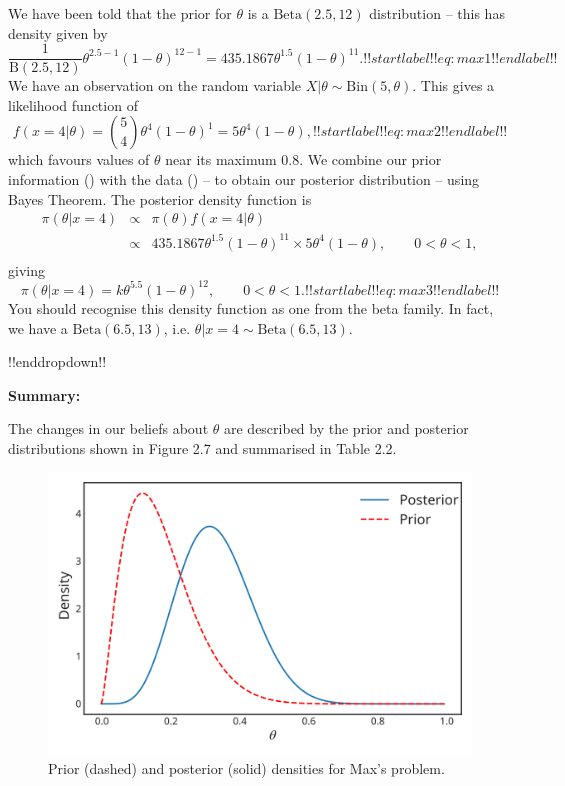 {We have been told that the prior for $\theta$ is a $\mathrm{Beta}(2.5,12)$ distribution -- this has density given by
    \begin{equation}
    \frac{1}{\mathrm{B}(2.5,12)}\theta^{2.5-1}(1-\theta)^{12-1} = 435.1867\theta^{1.5}(1-\theta)^{11}.
    !!startlabel!! eq:max1 !!endlabel!!
    \end{equation}
    We have an observation on the random variable $X|\theta \sim \mathrm{Bin}(5,\theta)$.  This gives a likelihood function of 
    \begin{equation}
    f(x=4|\theta)  = \binom{5}{4} \theta^{4}(1-\theta)^{1} = 5 \theta^{4}(1-\theta),
    !!startlabel!! eq:max2 !!endlabel!!
    \end{equation}
    which favours values of $\theta$ near its maximum 0.8.  We combine our prior information () with the data () -- to obtain our posterior distribution -- using Bayes Theorem.  The posterior density function is
    \begin{eqnarray*}
    \pi(\theta|x=4) &\propto& \pi(\theta)f(x=4|\theta)\\
                    &\propto& 435.1867 \theta^{1.5}(1-\theta)^{11} \times 5 \theta^{4}(1-\theta), \qquad 0<\theta<1,  \\
    \end{eqnarray*}
    giving
    \begin{equation}
    \pi(\theta|x=4) = k \theta^{5.5}(1-\theta)^{12}, \qquad 0<\theta<1.
    !!startlabel!! eq:max3 !!endlabel!! 
    \end{equation}
    You should recognise this density function as one from the beta family.  In fact, we have a $\mathrm{Beta}(6.5, 13)$, i.e. $\theta|x=4 \sim \mathrm{Beta}(6.5,13)$.

!!enddropdown!!


\textbf{Summary:}

The changes in our beliefs about $\theta$ are described by the prior and posterior distributions shown in Figure 2.7 and summarised in Table 2.2.
\begin{figure}[h!]

\includegraphics{images/priorposterior2.svg}
\caption{Prior (dashed) and posterior (solid) densities for Max's problem.}



\end{figure}}
